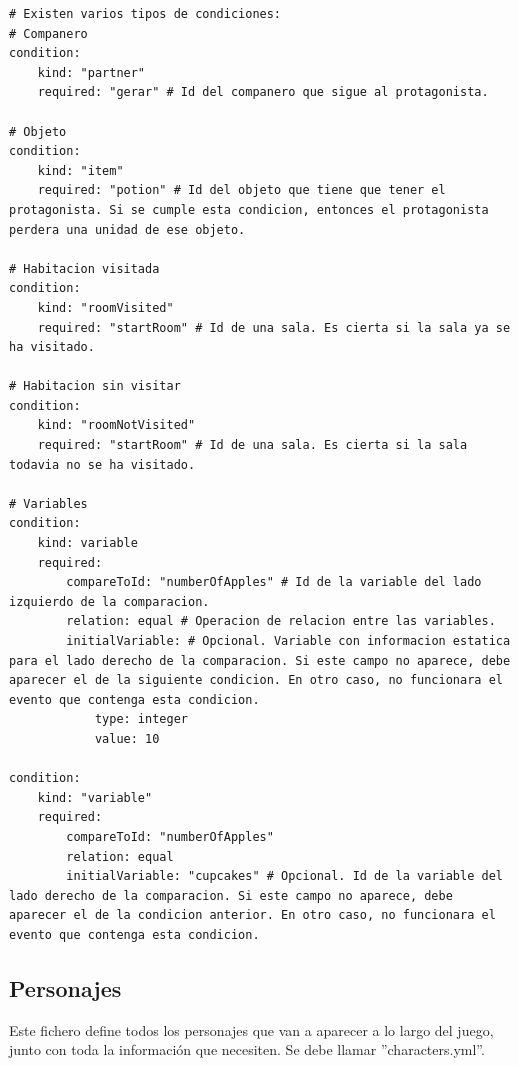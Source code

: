 \begin{lstlisting}
# Existen varios tipos de condiciones:
# Companero
condition:
	kind: "partner"
	required: "gerar" # Id del companero que sigue al protagonista.
	
# Objeto
condition:
	kind: "item"
	required: "potion" # Id del objeto que tiene que tener el protagonista. Si se cumple esta condicion, entonces el protagonista perdera una unidad de ese objeto.
	
# Habitacion visitada
condition:
	kind: "roomVisited"
	required: "startRoom" # Id de una sala. Es cierta si la sala ya se ha visitado.
	
# Habitacion sin visitar
condition:
	kind: "roomNotVisited"
	required: "startRoom" # Id de una sala. Es cierta si la sala todavia no se ha visitado.
	
# Variables
condition:
	kind: variable
	required:
		compareToId: "numberOfApples" # Id de la variable del lado izquierdo de la comparacion.
		relation: equal # Operacion de relacion entre las variables.
		initialVariable: # Opcional. Variable con informacion estatica para el lado derecho de la comparacion. Si este campo no aparece, debe aparecer el de la siguiente condicion. En otro caso, no funcionara el evento que contenga esta condicion.
			type: integer
			value: 10
		
condition:
	kind: "variable"
	required:
		compareToId: "numberOfApples"
		relation: equal
		initialVariable: "cupcakes" # Opcional. Id de la variable del lado derecho de la comparacion. Si este campo no aparece, debe aparecer el de la condicion anterior. En otro caso, no funcionara el evento que contenga esta condicion.

\end{lstlisting}


\subsection{Personajes}
Este fichero define todos los personajes que van a aparecer a lo largo del juego, junto con toda la información que necesiten. Se debe llamar ''characters.yml''.

